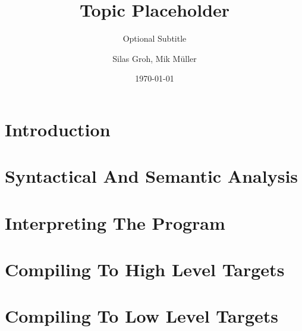 



% 
% 

\titlehead{\centering\texttt{[image: pictures/title.png]}}
\title{Topic Placeholder}
\subtitle{Optional Subtitle}
\author{Silas Groh, Mik Müller}
\publishers{Carl Fuhlrott Gymnasium}
\date{\today}


\maketitle

\tableofcontents

\chapter{Introduction}




\chapter{Syntactical And Semantic Analysis}



\chapter{Interpreting The Program}



\chapter{Compiling To High Level Targets}



\chapter{Compiling To Low Level Targets}





%

\listoffigures
\listoftables
{}
\nocite{*}
\printbibliography[heading=bibintoc]

